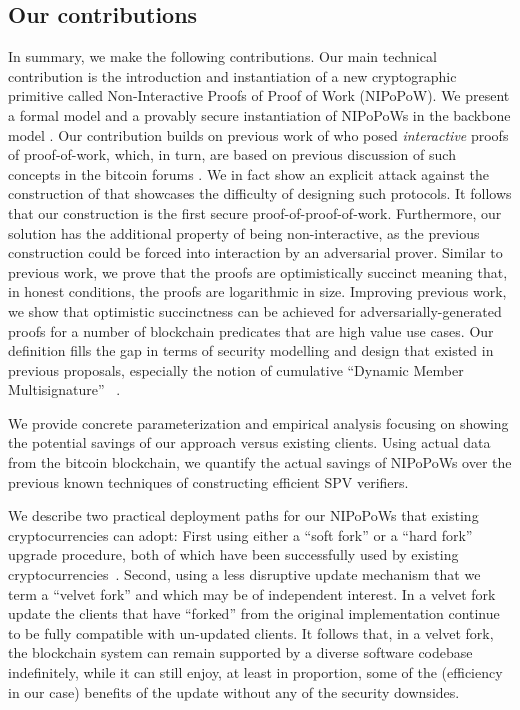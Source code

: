 \subsection{Our contributions}
In summary, we make the following contributions.
Our main technical contribution is the introduction and instantiation
of a new cryptographic
primitive called Non-Interactive Proofs of Proof of Work (NIPoPoW).
%
We present a formal model and a provably secure instantiation of NIPoPoWs in the
backbone model \cite{backbone}. Our contribution builds on previous work  of \cite{KLS} who posed {\em interactive} proofs of proof-of-work, which, in turn,
are based on previous discussion of such concepts in the bitcoin forums
\cite{highway}. We in fact show an explicit attack against the construction of \cite{KLS} that showcases the difficulty of designing such protocols. It follows
that our construction is the first secure proof-of-proof-of-work.
Furthermore, our solution has the additional property of being non-interactive,
as the previous construction could be forced into interaction by an adversarial
prover. Similar to previous work, we prove that the proofs are
optimistically succinct meaning that, in honest conditions, the proofs are
logarithmic in size. Improving previous work, we show that optimistic
succinctness can be achieved for adversarially-generated proofs for a number
of blockchain predicates that are high value use cases. Our definition
fills the gap in terms of security modelling and design that existed in previous
proposals, especially the notion of cumulative ``Dynamic Member Multisignature''
~\cite{sidechains}.

We provide concrete parameterization and empirical analysis focusing on showing
the potential savings of our approach versus existing clients. Using actual data
from the bitcoin blockchain, we quantify the actual savings of NIPoPoWs over the
previous known techniques of constructing efficient SPV verifiers.

We describe two practical deployment paths for our NIPoPoWs that existing
cryptocurrencies can adopt: First using either a ``soft fork'' or a ``hard
fork'' upgrade procedure, both of which have been successfully used by existing
cryptocurrencies~\cite{sok}. Second, using a less disruptive update mechanism
that we term a ``velvet fork'' and which may be of independent interest. In a
velvet fork update the clients that have ``forked'' from the original
implementation continue to be fully compatible with un-updated clients. It
follows that, in a velvet fork, the blockchain system can remain supported by a
diverse software codebase indefinitely, while it can still enjoy, at least in
proportion, some of the (efficiency in our case) benefits of the update without
any of the security downsides.
